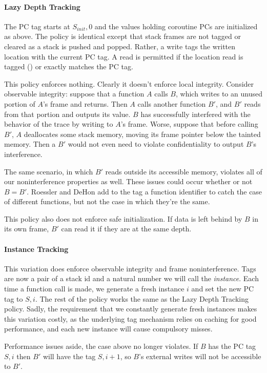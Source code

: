 \documentclass{article}
\begin{document}
    \paragraph{Lazy Depth Tracking}

      The PC tag starts at \(S_{init},0\) and the values holding coroutine PCs are initialized as above. The policy is
      identical except that stack frames are not tagged or cleared as a stack is pushed and popped. Rather, a write
      tags the written location with the current PC tag. A read is permitted if the location read is tagged
      () or exactly matches the PC tag.

      This policy enforces nothing. Clearly it doesn't enforce local integrity. Consider observable integrity:
      suppose that a function \(A\) calls \(B\), which writes to an unused portion of \(A\)'s frame and returns.
      Then \(A\) calls another function \(B'\), and \(B'\) reads from that portion and outputs its value.
      \(B\) has successfully interfered with the behavior of the trace by writing to \(A\)'s frame. Worse,
      suppose that before calling \(B'\), \(A\) deallocates some stack memory, moving its frame pointer
      below the tainted memory. Then a \(B'\) would not even need to violate confidentiality to output
      \(B\)'s interference.

      The same scenario, in which \(B'\) reads outside its accessible memory, violates all of our
      noninterference properties as well. These issues could occur whether or not \(B = B'\). Roessler
      and DeHon add to the tag a function identifier to catch the case of different functions, but not
      the case in which they're the same.

      This policy also  does not enforce safe initialization. If data is left behind by \(B\) in its own frame,
      \(B'\) can read it if they are at the same depth.

    \paragraph{Instance Tracking}

      This variation does enforce observable integrity and frame noninterference. Tags are now a pair of
      a stack id and a natural number we will call the {\it instance}. Each time a function call is made,
      we generate a fresh instance \(i\) and set the new PC tag to \(S,i\). The rest of the policy works
      the same as the Lazy Depth Tracking policy. Sadly, the requirement that we constantly generate fresh
      instances makes this variation costly, as the underlying tag mechanism relies on caching for good
      performance, and each new instance will cause compulsory misses.

      Performance issues aside, the case above no longer violates. If \(B\) has the PC tag \(S,i\)
      then \(B'\) will have the tag \(S,i+1\), so \(B\)'s external writes will not be accessible to
      \(B'\).

  
  
\end{document}
